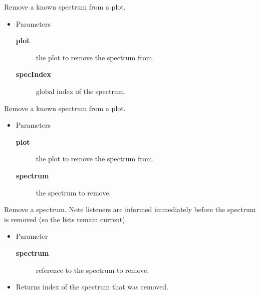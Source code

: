 \begin{desc}Remove a known spectrum from a plot.
\begin{itemize}
\item{Parameters
  \begin{description}
   \item[\textbf{plot}]{the plot to remove the spectrum from.}
   \item[\textbf{specIndex}]{global index of the spectrum.}
  \end{description}}
\end{itemize}
\end{desc}

\begin{desc}Remove a known spectrum from a plot.
\begin{itemize}
\item{Parameters
  \begin{description}
   \item[\textbf{plot}]{the plot to remove the spectrum from.}
   \item[\textbf{spectrum}]{the spectrum to remove.}
  \end{description}}
\end{itemize}
\end{desc}

\begin{desc}Remove a spectrum. Note listeners are informed immediately
  before the spectrum is removed (so the lists remain current).
\begin{itemize}
\item{Parameter
  \begin{description}
   \item[\textbf{spectrum}]{reference to the spectrum to remove.}
  \end{description}}
\end{itemize}
\begin{itemize}
\item{Returns index of the spectrum that was removed. }
\end{itemize}
\end{desc}

